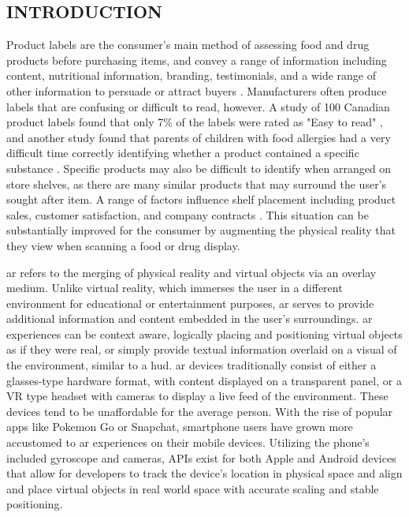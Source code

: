 \documentclass[thesis]{fputhesis}
\author{Colter Roche}       %
\title{Item-FindAR: Improving Consumer Awareness \and
  through Mobile Augmented Reality \and
  on the Web}
\begin{document}
\makefrontmatter


\begin{body}

\chapter{INTRODUCTION}
Product labels are the consumer's main method of assessing food and drug products before purchasing items, and convey a range of information including content, nutritional information, branding, testimonials, and a wide range of other information to persuade or attract buyers \cite{nute_product_2019}. Manufacturers often produce labels that are confusing or difficult to read, however. A study of 100 Canadian product labels found that only 7\% of the labels were rated as "Easy to read" \cite{mackey_ease_2009}, and another study found that parents of children with food allergies had a very difficult time correctly identifying whether a product contained a specific substance \cite{joshi_interpretation_2002}. Specific products may also be difficult to identify when arranged on store shelves, as there are many similar products that may surround the user's sought after item. A range of factors influence shelf placement including product sales, customer satisfaction, and company contracts \cite{sun_segmentation_2019}. This situation can be substantially improved for the consumer by augmenting the physical reality that they view when scanning a food or drug display.


\acrfull{ar} refers to the merging of physical reality and virtual objects via an overlay medium. Unlike virtual reality, which immerses the user in a different environment for educational or entertainment purposes, \acrshort{ar} serves to provide additional information and content embedded in the user's surroundings. \acrshort{ar} experiences can be context aware, logically placing and positioning virtual objects as if they were real, or simply provide textual information overlaid on a visual of the environment, similar to a \acrlong{hud}. \acrshort{ar} devices traditionally consist of either a glasses-type hardware format, with content displayed on a transparent panel, or a VR type headset with cameras to display a live feed of the environment. These devices tend to be unaffordable for the average person. With the rise of popular apps like Pokemon Go or Snapchat, smartphone users have grown more accustomed to \acrshort{ar} experiences on their mobile devices. Utilizing the phone's included gyroscope and cameras, APIs exist for both Apple and Android devices that allow for developers to track the device's location in physical space and align and place virtual objects in real world space with accurate scaling and stable positioning.


\end{body}
\end{document}

